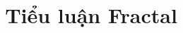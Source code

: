 \documentclass[oneside,final]{report}
\title{\LARGE Tiểu luận Fractal}
\begin{document}
\coverpage%


\tableofcontents

\clearpage
\end{document}
